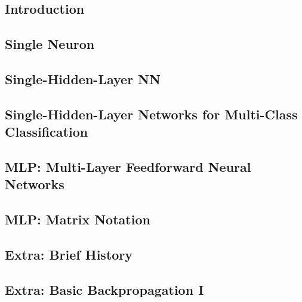 \subsection{Introduction}


\subsection{Single Neuron}


\subsection{Single-Hidden-Layer NN}


\subsection{Single-Hidden-Layer Networks for Multi-Class Classification}


\subsection{MLP: Multi-Layer Feedforward Neural Networks}


\subsection{MLP: Matrix Notation}

%

\subsection{Extra: Brief History}


\subsection{Extra: Basic Backpropagation I}


